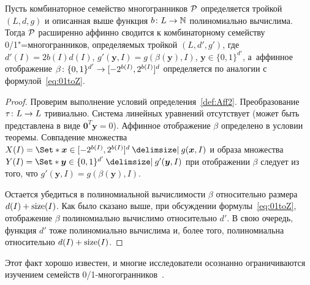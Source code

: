 \begin{theorem}
	Пусть комбинаторное семейство многогранников ${\mathcal P}$ определяется тройкой $(L,d,g)$ и описанная выше функция $b \colon L \to \mathbb{N}$ полиномиально вычислима.
	Тогда ${\mathcal P}$ расширенно аффинно сводится к комбинаторному семейству 0/1"=многогранников,
	определяемых тройкой $(L,d',g')$, где $d'(I) = 2b(I)d(I)$,
	$g'(\bm{y}, I) = g(\beta(\bm{y}), I)$, $\bm{y} \in \{0,1\}^{d'}$,
	а~аффинное отображение $\beta \colon \{0,1\}^{d'} \to [-2^{b(I)}, 2^{b(I)}]^d$ определяется по аналогии с формулой~\eqref{eq:01toZ}.
\end{theorem}
\begin{proof}
	Проверим выполнение условий определения~\ref{def:Aff2}.
	Преобразование $\tau \colon L \to L$ тривиально.
	Система линейных уравнений отсутствует (может быть представлена в виде $\bm{0}^T \bm{y} = 0$).
	Аффинное отображение $\beta$ определено в условии теоремы.
	Совпадение множества $X(I) = \Set*{\bm{x} \in [-2^{b(I)}, 2^{b(I)}]^d \given g(\bm{x}, I)}$ и образа множества $Y(I) = \Set*{\bm{y} \in \{0,1\}^{d'} \given g'(\bm{y}, I)}$ при отображении $\beta$ следует из того, что $g'(\bm{y}, I) = g(\beta(\bm{y}), I)$.
	
	Остается убедиться в полиномиальной вычислимости $\beta$ относительно размера $d(I) + \operatorname{size}(I)$.
	Как было сказано выше, при обсуждении формулы~\eqref{eq:01toZ}, отображение $\beta$ полиномиально вычислимо относительно $d'$.
	В свою очередь, функция $d'$ тоже полиномиально вычислима и, более того, полиномиальна относительно $d(I) + \operatorname{size}(I)$.
\end{proof}

Этот факт хорошо известен, и многие исследователи осознанно ограничиваются изучением семейств 0/1-многогранников~\cite{Junger:1995,Papadimitriou:1984}.



